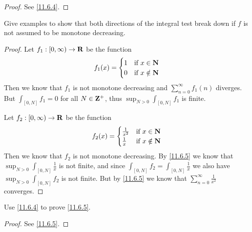 \begin{proof}
  See \cref{11.6.4}.
\end{proof}

\begin{exercise}\label{ex 11.6.4}
  Give examples to show that both directions of the integral test break down if \(f\) is not assumed to be monotone decreasing.
\end{exercise}

\begin{proof}
  Let \(f_1 : [0, \infty) \to \mathbf{R}\) be the function
  \[
    f_1(x) = \begin{cases}
      1 & \text{if } x \in \mathbf{N}    \\
      0 & \text{if } x \notin \mathbf{N}
    \end{cases}
  \]
  Then we know that \(f_1\) is not monotone decreasing and \(\sum_{n = 0}^\infty f_1(n)\) diverges.
  But \(\int_{[0, N]} f_1 = 0\) for all \(N \in \mathbf{Z}^+\), thus \(\sup_{N > 0} \int_{[0, N]} f_1\) is finite.

  Let \(f_2 : [0, \infty) \to \mathbf{R}\) be the function
  \[
    f_2(x) = \begin{cases}
      \frac{1}{x^2} & \text{if } x \in \mathbf{N}    \\
      \frac{1}{x}   & \text{if } x \notin \mathbf{N}
    \end{cases}
  \]
  Then we know that \(f_2\) is not monotone decreasing.
  By \cref{11.6.5} we know that \(\sup_{N > 0} \int_{[0, N]} \frac{1}{x}\) is not finite, and since \(\int_{[0, N]} f_2 = \int_{[0, N]} \frac{1}{x}\) we also have \(\sup_{N > 0} \int_{[0, N]} f_2\) is not finite.
  But by \cref{11.6.5} we know that \(\sum_{n = 0}^\infty \frac{1}{x^2}\) converges.
\end{proof}

\begin{exercise}\label{ex 11.6.5}
  Use \cref{11.6.4} to prove \cref{11.6.5}.
\end{exercise}

\begin{proof}
  See \cref{11.6.5}.
\end{proof}